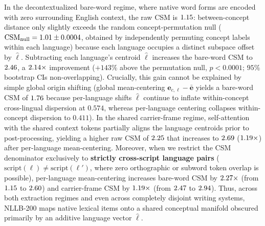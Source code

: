 In the decontextualized bare-word regime, where native word forms are encoded with zero surrounding English context, the raw CSM is $1.15{}$: between-concept distance only slightly exceeds the random concept-permutation null ($\text{CSM}_{\text{null}} = 1.01{} \pm 0.0004$, obtained by independently permuting concept labels within each language) because each language occupies a distinct subspace offset by $\hat{\boldsymbol{\ell}}$.
Subtracting each language's centroid $\hat{\boldsymbol{\ell}}$ increases the bare-word CSM to $2.46{}$, a $2.14{}\times$ improvement ($+143\%$ above the permutation null, $p < 0.0001$; $95\%$ bootstrap CIs non-overlapping).
Crucially, this gain cannot be explained by simple global origin shifting (global mean-centering $\mathbf{e}_{c,\ell} - \bar{\mathbf{e}}$ yields a bare-word CSM of $1.76{}$ because per-language shifts $\hat{\boldsymbol{\ell}}$ continue to inflate within-concept cross-lingual dispersion at $0.574$, whereas per-language centering collapses within-concept dispersion to $0.411$).
In the shared carrier-frame regime, self-attention with the shared context tokens partially aligns the language centroids prior to post-processing, yielding a higher raw CSM of $2.25{}$ that increases to $2.69{}$ ($1.19{}\times$) after per-language mean-centering.
Moreover, when we restrict the CSM denominator exclusively to \textbf{strictly cross-script language pairs} ($\text{script}(\ell) \neq \text{script}(\ell')$, where zero orthographic or subword token overlap is possible), per-language mean-centering increases bare-word CSM by $2.27{}\times$ (from $1.15{}$ to $2.60{}$) and carrier-frame CSM by $1.19{}\times$ (from $2.47{}$ to $2.94{}$).
Thus, across both extraction regimes and even across completely disjoint writing systems, NLLB-200 maps native lexical items onto a shared conceptual manifold obscured primarily by an additive language vector $\hat{\boldsymbol{\ell}}$.

